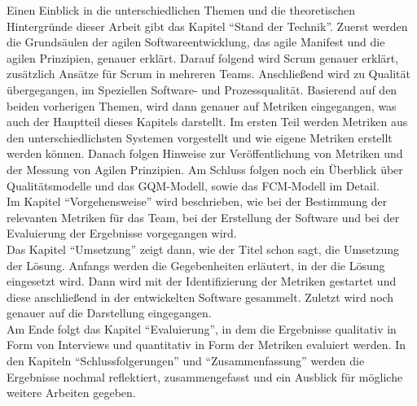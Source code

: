 Einen Einblick in die unterschiedlichen Themen und die theoretischen Hintergründe dieser Arbeit gibt das Kapitel ``Stand der Technik''.
Zuerst werden die Grundsäulen der agilen Softwareentwicklung, das agile Manifest und die agilen Prinzipien, genauer erklärt.
Darauf folgend wird Scrum genauer erklärt, zusätzlich Ansätze für Scrum in mehreren Teams.
Anschließend wird zu Qualität übergegangen, im Speziellen Software- und Prozessqualität.
Basierend auf den beiden vorherigen Themen, wird dann genauer auf Metriken eingegangen, was auch der Hauptteil dieses Kapitels darstellt.
Im ersten Teil werden Metriken aus den unterschiedlichsten Systemen vorgestellt und wie eigene Metriken erstellt werden können.
Danach folgen Hinweise zur Veröffentlichung von Metriken und der Messung von Agilen Prinzipien.
Am Schluss folgen noch ein Überblick über Qualitätsmodelle und das \ac{GQM}-Modell, sowie das \ac{FCM}-Modell im Detail.
\\
Im Kapitel ``Vorgehensweise'' wird beschrieben, wie bei der Bestimmung der relevanten Metriken für das Team, bei der Erstellung der Software und bei der Evaluierung der Ergebnisse vorgegangen wird.
\\
Das Kapitel ``Umsetzung'' zeigt dann, wie der Titel schon sagt, die Umsetzung der Lösung.
Anfangs werden die Gegebenheiten erläutert, in der die Lösung eingesetzt wird.
Dann wird mit der Identifizierung der Metriken gestartet und diese anschließend in der entwickelten Software gesammelt.
Zuletzt wird noch genauer auf die Darstellung eingegangen.
\\
Am Ende folgt das Kapitel ``Evaluierung'', in dem die Ergebnisse qualitativ in Form von Interviews und quantitativ in Form der Metriken evaluiert werden.
In den Kapiteln ``Schlussfolgerungen'' und ``Zusammenfassung'' werden die Ergebnisse nochmal reflektiert, zusammengefasst und ein Ausblick für mögliche weitere Arbeiten gegeben.
